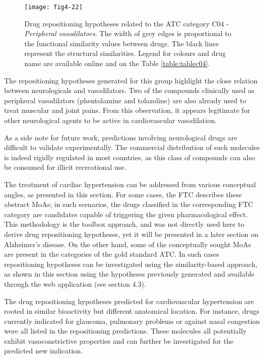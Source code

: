 \begin{figure}[H]
    \centering
    \texttt{[image: fig4-22]}
    \caption{Drug repositioning hypotheses related to the ATC category C04 - \emph{Peripheral vasodilators}. The width of grey edges is proportional to the functional similarity values between drugs. The black lines represent the structural similarities. Legend for colours and drug name are available online and on the Table \ref{table:tablec04}.}
    \label{fig4-22}
\end{figure}

The repositioning hypotheses generated for this group highlight the close relation between neurologicals and vasodilators. Two of the compounds clinically used as peripheral vasodilators (phentolamine and tolazoline) are also already used to treat muscular and joint pains. From this observation, it appears legitimate for other neurological agents to be active in cardiovascular vasodilation.

As a side note for future work, predictions involving neurological drugs are difficult to validate experimentally. The commercial distribution of such molecules is indeed rigidly regulated in most countries, as this class of compounds can also be consumed for illicit recreational use.

The treatment of cardiac hypertension can be addressed from various conceptual angles, as presented in this section. For some cases, the FTC describes these abstract MoAs; in such scenarios, the drugs classified in the corresponding FTC category are candidates capable of triggering the given pharmacological effect. This methodology is the toolbox approach, and was not directly used here to derive drug repositioning hypotheses, yet it will be presented in a later section on Alzheimer's disease. On the other hand, some of the conceptually sought MoAs are present in the categories of the gold standard ATC. In such cases repositioning hypotheses can be investigated using the similarity-based approach, as shown in this section using the hypotheses previously generated and available through the web application (see section 4.3).

The drug repositioning hypotheses predicted for cardiovascular hypertension are rooted in similar bioactivity but different anatomical location. For instance, drugs currently indicated for glaucoma, pulmonary problems or against nasal congestion were all listed in the repositioning predictions. These molecules all potentially exhibit vasoconstrictive properties and can further be investigated for the predicted new indication.

